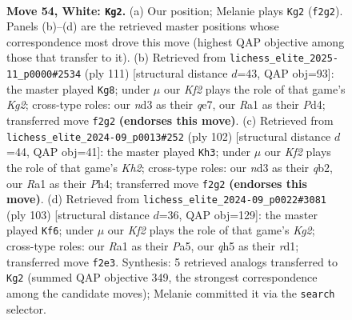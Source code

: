 \documentclass[11pt]{article}
\begin{document}
\clearpage

\begin{figure}[p]\centering
\begin{subfigure}{0.46\textwidth}\centering
\resizebox{\linewidth}{!}{%
\newchessgame
\chessboard[
  setfen={6k1/p7/1p6/4Qp1q/P1p5/3n2P1/1P3K2/R7 w - - 1 54},
  showmover=false,
  pgfstyle=straightmove, color=movearrow, markmove={f2-g2}
]}
\caption{}
\end{subfigure}\hfill
\begin{subfigure}{0.46\textwidth}\centering
\resizebox{\linewidth}{!}{%
\newchessgame
\chessboard[
  setfen={8/4Q1kp/1p6/6p1/pP1p4/5Pq1/P5P1/6K1 b - - 6 56},
  showmover=false,
  pgfstyle=straightmove, color=movearrow, markmove={g7-g8}
]}
\caption{}
\end{subfigure}
\\[4pt]
\begin{subfigure}{0.46\textwidth}\centering
\resizebox{\linewidth}{!}{%
\newchessgame
\chessboard[
  setfen={8/7k/6p1/2p4p/p1P4P/P2Q2P1/1q5K/8 w - - 2 52},
  showmover=false,
  pgfstyle=straightmove, color=movearrow, markmove={h2-h3}
]}
\caption{}
\end{subfigure}\hfill
\begin{subfigure}{0.46\textwidth}\centering
\resizebox{\linewidth}{!}{%
\newchessgame
\chessboard[
  setfen={8/6k1/3q3p/pp1P1Np1/5pP1/8/PP3K2/3R4 b - - 12 52},
  showmover=false,
  pgfstyle=straightmove, color=movearrow, markmove={g7-f6}
]}
\caption{}
\end{subfigure}
\caption{\textbf{Move 54, White: \texttt{Kg2}.} (a) Our position; Melanie plays \texttt{Kg2} (\texttt{f2g2}). Panels (b)--(d) are the retrieved master positions whose correspondence most drove this move (highest QAP objective among those that transfer to it). (b) Retrieved from \texttt{lichess\_elite\_2025-11\_p0000\#2534} (ply 111) [structural distance $d$=43, QAP obj=93]: the master played \texttt{Kg8}; under $\mu$ our \emph{Kf2} plays the role of that game's \emph{Kg2}; cross-type roles: our \emph{n}d3 as their \emph{q}e7, our \emph{R}a1 as their \emph{P}d4; transferred move \texttt{f2g2} \textbf{(endorses this move)}. (c) Retrieved from \texttt{lichess\_elite\_2024-09\_p0013\#252} (ply 102) [structural distance $d$=44, QAP obj=41]: the master played \texttt{Kh3}; under $\mu$ our \emph{Kf2} plays the role of that game's \emph{Kh2}; cross-type roles: our \emph{n}d3 as their \emph{q}b2, our \emph{R}a1 as their \emph{P}h4; transferred move \texttt{f2g2} \textbf{(endorses this move)}. (d) Retrieved from \texttt{lichess\_elite\_2024-09\_p0022\#3081} (ply 103) [structural distance $d$=36, QAP obj=129]: the master played \texttt{Kf6}; under $\mu$ our \emph{Kf2} plays the role of that game's \emph{Kg2}; cross-type roles: our \emph{R}a1 as their \emph{P}a5, our \emph{q}h5 as their \emph{r}d1; transferred move \texttt{f2e3}. Synthesis: 5 retrieved analogs transferred to \texttt{Kg2} (summed QAP objective 349, the strongest correspondence among the candidate moves); Melanie committed it via the \texttt{search} selector.}
\label{fig:thought-m106}
\end{figure}
\end{document}
